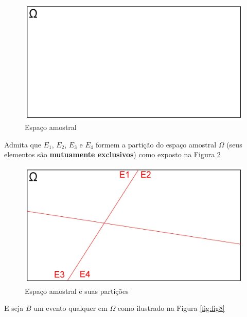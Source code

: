 \documentclass[
]{book}
\begin{document}
\hfill\break

\begin{figure}

{\centering \includegraphics[width=0.8\linewidth]{images4/bayes_1} 

}

\caption{Espaço amostral}\label{fig:fig6}
\end{figure}

\hfill\break

Admita que \(E_{1}\), \(E_{2}\), \(E_{3}\) e \(E_{4}\) formem a partição do espaço amostral \(\Omega\) (seus elementos são \textbf{mutuamente exclusivos}) como exposto na Figura \ref{fig:fig7}

\hfill\break

\begin{figure}

{\centering \includegraphics[width=0.8\linewidth]{images4/bayes_2} 

}

\caption{Espaço amostral e suas partições}\label{fig:fig7}
\end{figure}

\hfill\break

E seja \(B\) um evento qualquer em \(\Omega\) como ilustrado na Figura \ref{fig:fig8}

\hfill\break
\end{document}
